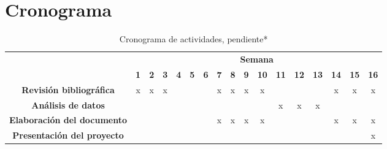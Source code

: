 \section{Cronograma}
	\begin{table}[h]
		\centering
		\caption{Cronograma de actividades, pendiente*}
		\label{tb: cronograma}
		\footnotesize
		\begin{tabular}{|c|c|c|c|c|c|c|c|c|c|c|c|c|c|c|c|c|}
			\hline
			\rowcolor[HTML]{C0C0C0} 
			\cellcolor[HTML]{C0C0C0}                                       & \multicolumn{16}{c|}{\cellcolor[HTML]{C0C0C0}\textbf{Semana}} \\ \cline{2-17} 
			\rowcolor[HTML]{EFEFEF} 
			\multirow{-2}{*}{\cellcolor[HTML]{C0C0C0}\textbf{Actividades}} & \textbf{1} & \textbf{2} & \textbf{3} & \textbf{4} & \textbf{5} & \textbf{6} & \textbf{7} & \textbf{8} & \textbf{9} & \textbf{10} & \textbf{11} & \textbf{12} & \textbf{13} & \textbf{14} & \textbf{15} & \textbf{16} \\ \hline
			\cellcolor[HTML]{EFEFEF}
			\textbf{Revisión bibliográfica} & x & x & x & & & & x & x & x & x & & & & x & x & x \\ \hline
			\cellcolor[HTML]{EFEFEF}\textbf{Análisis de datos} & & & & & & & & & & & x & x & x & & & \\ \hline
			\cellcolor[HTML]{EFEFEF}\textbf{Elaboración del documento} & & & & & & & x & x & x & x & & & & x & x & x \\ \hline
			\cellcolor[HTML]{EFEFEF}\textbf{Presentación del proyecto} & & & & & & & & & & & & & & & & x \\ \hline
		\end{tabular}
	\end{table}